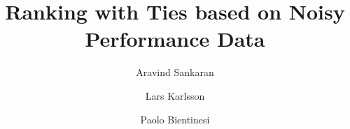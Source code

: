 \documentclass[acmsmall,screen, review]{acmart}
\begin{document}
\title{Ranking with Ties based on Noisy Performance Data}

\author{Aravind Sankaran}

\author{Lars Karlsson}
\author{Paolo Bientinesi}


%
%

%
%

\renewcommand{\shortauthors}{Sankaran, et al.}
\end{document}
